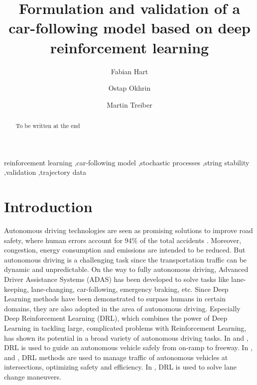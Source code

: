 \documentclass[review]{elsarticle}
\providecommand{\3}{{\ss}}
\begin{document}
\begin{frontmatter}

\title{Formulation and validation of a car-following model based on deep
  reinforcement learning}


\author[firstAddress]{Fabian Hart}
\author[firstAddress,secondAddress]{Ostap Okhrin}
\author[firstAddress,secondAddress]{Martin Treiber}

\address[firstAddress]{TU Dresden}
\address[secondAddress]{Possible second address}




\begin{abstract}
To be written at the end
\end{abstract}

\begin{keyword}
reinforcement learning \sep car-following model \sep stochastic
processes \sep string stability \sep validation \sep trajectory data 
\end{keyword}

\end{frontmatter}


\section{Introduction}
Autonomous driving technologies are seen as promising solutions to improve road safety, where human errors account for 94\% of the total accidents \cite{vehicleCrashSurvey2015}. Moreover, congestion, energy consumption and emissions are intended to be reduced. 
But autonomous driving is a challenging task since the transportation traffic can be dynamic and unpredictable.
On the way to fully autonomous driving, Advanced Driver Assistance Systems
(ADAS) has been developed to solve tasks like lane-keeping, lane-changing, car-following, emergency braking, etc.
Since Deep Learning methods have been demonstrated to surpass humans in certain domains, they are also adopted in the area of autonomous driving.
Especially Deep Reinforcement Learning (DRL), which combines the power of Deep Learning in tackling large, complicated problems with Reinforcement Learning, has shown its potential in a broad variety of autonomous driving tasks. 
In \cite{OnRampMerge2018} and \cite{OnRampMerge2020}, DRL is used to guide an autonomous vehicle safely from on-ramp to freeway. In \cite{intersection1}, \cite{intersection3} and \cite{intersection2}, DRL methods are used to manage traffic of autonomous vehicles at intersections, optimizing safety and efficiency.
In \cite{LangeChange1}, DRL is used to solve lane change maneuvers.
\end{document}
